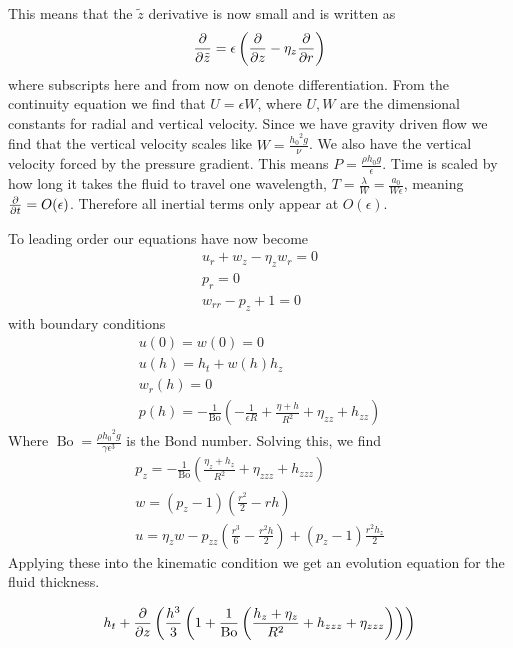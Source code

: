 \documentclass{jfm}
\DeclareMathOperator{\Bo}{Bo}
\begin{document}
This means that the $\tilde z$  derivative is now small and is written as
\begin{align}
	\pdv{\tilde{z}} = \epsilon\left(\pdv{z} - \eta_z\pdv{r}\right)
\end{align}
where subscripts here and from now on denote differentiation.
From the continuity equation we find that $U = \epsilon W$, where $U,W$ are the dimensional constants for radial and vertical velocity. Since we have gravity driven flow we find that the vertical velocity scales like $W  = \frac{{h_0}^2g}{\nu}$. We also have the vertical velocity forced by the pressure gradient. This means $P = \frac{\rho h_0 g}{\epsilon}$. Time is scaled by how long it takes the fluid to travel one wavelength, $ T = \frac{\lambda}{W} =  \frac{a_0}{W\epsilon}$, meaning $\pdv{t} = O(\epsilon)$. Therefore all inertial terms only appear at $O(\epsilon)$.
 
 To leading order our equations have now become
 \begin{align}
 	u_r + w_z - \eta_z w_r = 0\\
 	p_r = 0\\
 	w_{rr}-p_z +1 = 0
 \end{align}
with boundary conditions
\begin{align}
	u(0) = w(0) = 0\\
	u(h)  = h_t + w(h)h_z\\
	w_r(h) = 0\\
	p(h) = -\frac{1}{\Bo}\left(-\frac{1}{\epsilon R}+\frac{\eta + h}{R^2} + \eta_{zz} + h_{zz} \right)
\end{align}
	Where $\Bo = \frac{\rho {h_0}^2g}{\gamma\epsilon^3}$ is the Bond number. Solving this, we find 
	\begin{align}
		p_z = -\frac{1}{\Bo}\left(\frac{\eta_z+h_z}{R^2}+\eta_{zzz}+ h_{zzz}\right)\\
		w = (p_z - 1)\left(\frac{r^2}{2} - r h\right)\\
		u = \eta_z w - p_{zz}\left(\frac{r^3}{6} - \frac{r^2h}{2}\right)+(p_z - 1)\frac{r^2h_z}{2}
	\end{align}
Applying these into the kinematic condition we get an evolution equation for the fluid thickness.


	

	\begin{align}
	h_t + \pdv{z}\left(\frac{h^3}{3}\left( 1  + \frac{1}{\Bo}\left(\frac{h_z+ \eta_z}{R^2} + h_{zzz}+ \eta_{zzz}\right)\right) \right)\label{maineq}
	\end{align}
\end{document}

